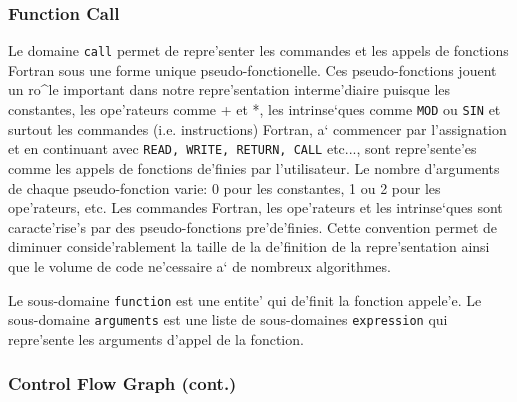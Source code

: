 \subsubsection{Function Call}
\label{subsubsection-call}

{

Le domaine \verb/call/ permet de repre'senter les commandes et les
appels de fonctions Fortran sous une forme unique pseudo-fonctionelle.
Ces pseudo-fonctions jouent un ro^le important dans notre
repre'sentation interme'diaire puisque les constantes, les ope'rateurs
comme + et *, les intrinse`ques comme {\tt MOD} ou {\tt SIN} et surtout
les commandes (i.e. instructions) Fortran, a` commencer par
l'assignation et en continuant avec {\tt READ, WRITE, RETURN, CALL}
etc..., sont repre'sente'es comme les appels de fonctions de'finies par
l'utilisateur. Le nombre d'arguments de chaque pseudo-fonction varie: 0
pour les constantes, 1 ou 2 pour les ope'rateurs, etc. Les commandes
Fortran, les ope'rateurs et les intrinse`ques sont caracte'rise's par
des pseudo-fonctions pre'de'finies. Cette convention permet de diminuer
conside'rablement la taille de la de'finition de la repre'sentation
ainsi que le volume de code ne'cessaire a` de nombreux algorithmes.

Le sous-domaine \verb/function/ est une entite' qui de'finit la fonction
appele'e. Le sous-domaine \verb/arguments/ est une liste de sous-domaines
\verb/expression/ qui repre'sente les arguments d'appel de la fonction.
}

\subsubsection{Control Flow Graph (cont.)}
\label{subsubsection-control}

